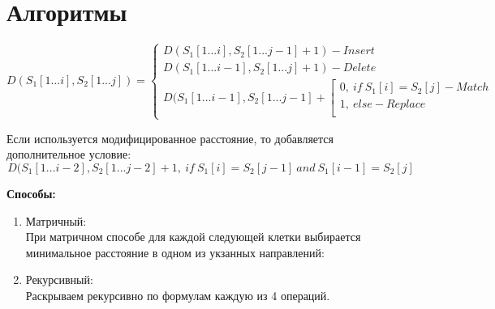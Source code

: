 \documentclass[a4paper,14pt]{report} %
\begin{document}
\section{Алгоритмы}

$$D(S_1[1...i], S_2[1...j]) = 
\left\{
  \begin{array}{lll}
    D(S_1[1...i], S_2[1...j - 1] + 1) - Insert \\
    D(S_1[1...i - 1], S_2[1...j] + 1) - Delete \\
    D(S_1[1...i - 1], S_2[1...j - 1] + 
    \left[
        \begin{array}{lll}
         0,~ if ~S_1[i] = S_2[j] - Match\\
         1, ~else - Replace \\
         \end{array}
    \right.
  \end{array}
\right.$$

Если используется модифицированное расстояние, то добавляется дополнительное условие:\\
$$D(S_1[1...i - 2], S_2[1...j - 2] + 1, ~ if ~S_1[i] = S_2[j - 1] ~and ~S_1[i - 1] = S_2[j ]$$

\textbf{Способы: }
\begin{enumerate}
  \item Матричный:\\
  При матричном способе для каждой следующей клетки выбирается минимальное расстояние в одном из укзанных направлений:
  \begin{figure}[h]
  \end{figure} 
  \item Рекурсивный:\\
  Раскрываем рекурсивно по формулам каждую из 4 операций. 
\end{enumerate}
\end{document}
